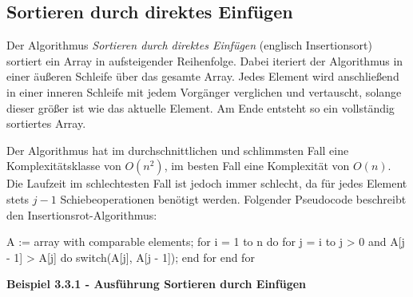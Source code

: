 \subsection{Sortieren durch direktes Einfügen}
Der Algorithmus \textit{Sortieren durch direktes Einfügen} (englisch Insertionsort) sortiert ein Array in aufsteigender Reihenfolge. Dabei iteriert der Algorithmus in einer äußeren Schleife über das gesamte Array. Jedes Element wird anschließend in einer inneren Schleife mit jedem Vorgänger verglichen und vertauscht, solange dieser größer ist wie das aktuelle Element. Am Ende entsteht so ein vollständig sortiertes Array.

Der Algorithmus hat im durchschnittlichen und schlimmsten Fall eine Komplexitätsklasse von $O(n^2)$, im besten Fall eine Komplexität von $O(n)$. Die Laufzeit im schlechtesten Fall ist jedoch immer schlecht, da für jedes Element stets $j - 1$ Schiebeoperationen benötigt werden. Folgender Pseudocode beschreibt den Insertionsrot-Algorithmus:

\begin{PseudoCode}
	A := array with comparable elements;
	for i = 1 to n do
		for j = i to j > 0 and A[j - 1] > A[j] do
			switch(A[j], A[j - 1]);
		end for
	end for
\end{PseudoCode}

\noindent
\textbf{Beispiel 3.3.1 - Ausführung Sortieren durch Einfügen}

